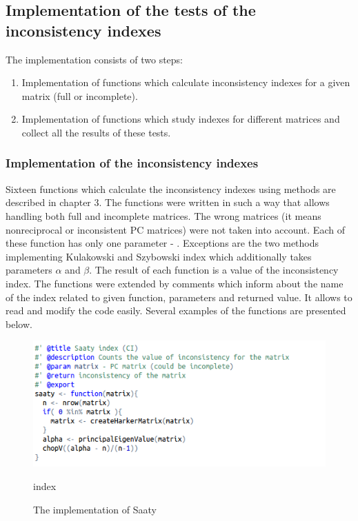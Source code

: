 \subsection{Implementation of the tests of the inconsistency indexes}
The implementation consists of two steps:
\begin{enumerate}
  \item Implementation of functions which calculate inconsistency indexes for a given matrix (full or incomplete).
  \item Implementation of functions which study indexes for different matrices and collect all the results of these tests. 
\end{enumerate}

\subsubsection{Implementation of the inconsistency indexes}
Sixteen functions which calculate the inconsistency indexes using methods are described in chapter 3. The functions were written in such a way that allows handling both full and incomplete matrices. The wrong matrices (it means nonreciprocal or inconsistent PC matrices) were not taken into account. Each of these function has only one parameter - . Exceptions are the two methods implementing Kulakowski and Szybowski index which additionally takes parameters $\alpha$ and $\beta$. The result of each function is a value of the inconsistency index. The functions were extended by comments which inform about the name of the index related to given function, parameters and returned value. It allows to read and modify the code easily. Several examples of the functions are presented below.

\begin{figure}[h]
\centerline{\includegraphics[scale=0.75]{images/kod1.png}}
\caption{The implementation of Saaty} index
\label{fig:rstudio}
\end{figure}


